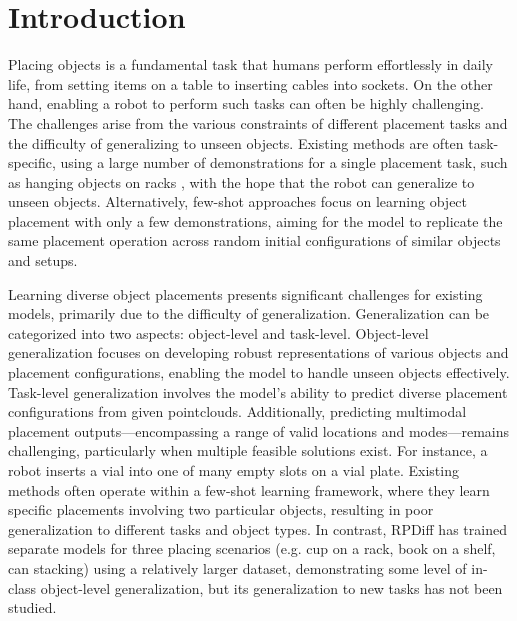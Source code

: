 \section{Introduction}

Placing objects is a fundamental task that humans perform effortlessly in daily life, from setting items on a table to inserting cables into sockets. On the other hand, enabling a robot to perform such tasks can often be highly challenging. The challenges arise from the various constraints of different placement tasks and the difficulty of generalizing to unseen objects. Existing methods are often task-specific, using a large number of demonstrations for a single placement task, such as hanging objects on racks \cite{simeonov2023rpdiff}, with the hope that the robot can generalize to unseen objects. Alternatively, few-shot approaches focus on learning object placement with only a few demonstrations, aiming for the model to replicate the same placement operation across random initial configurations of similar objects and setups.

Learning diverse object placements presents significant challenges for existing models, primarily due to the difficulty of generalization. Generalization can be categorized into two aspects: object-level and task-level. Object-level generalization focuses on developing robust representations of various objects and placement configurations, enabling the model to handle unseen objects effectively. Task-level generalization involves the model's ability to predict diverse placement configurations from given pointclouds. Additionally, predicting multimodal placement outputs—encompassing a range of valid locations and modes—remains challenging, particularly when multiple feasible solutions exist. For instance, a robot inserts a vial into one of many empty slots on a vial plate. Existing methods \cite{simeonov2021neuraldescriptorfieldsse3equivariant, 10160423, pmlr-v205-simeonov23a, pan2022taxpose, ryu2023diffusionedfsbiequivariantdenoisinggenerative, ryu2023equivariantdescriptorfieldsse3equivariant, gao2024riemann, eisner2024deep, huang2024imagination, huang2024matchpolicysimplepipeline} often operate within a few-shot learning framework, where they learn specific placements involving two particular objects, resulting in poor generalization to different tasks and object types. In contrast, RPDiff \cite{simeonov2023rpdiff} has trained separate models for three placing scenarios (e.g. cup on a rack, book on a shelf, can stacking) using a relatively larger dataset, demonstrating some level of in-class object-level generalization, but its generalization to new tasks has not been studied.   


